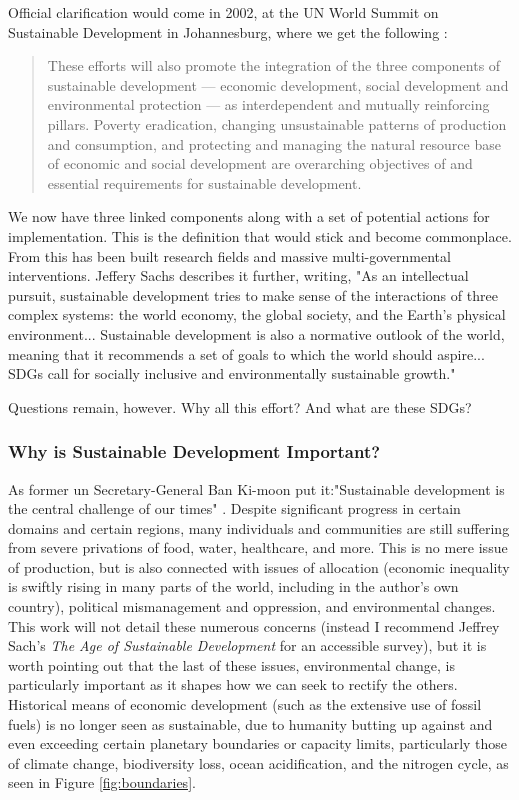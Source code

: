 Official clarification would come in 2002, at the UN World Summit on Sustainable Development in Johannesburg, where we get the following \cite{worldsummitonsustainabledevelopmentPlanImplementationWorld2002}:

\blockquote{These efforts will also promote the integration of the three components of sustainable development — economic development, social development and environmental protection — as interdependent and mutually reinforcing pillars. Poverty eradication, changing unsustainable patterns of production and
consumption, and protecting and managing the natural resource base of economic and social development are overarching objectives of and essential requirements for sustainable development.}

We now have three linked components along with a set of potential actions for implementation. This is the definition that would stick and become commonplace. From this has been built research fields and massive multi-governmental interventions. Jeffery Sachs describes it further, writing, "As an intellectual pursuit, sustainable development tries to make sense of the interactions of three complex systems: the world economy, the global society, and the Earth's physical environment... Sustainable development is also a normative outlook of the world, meaning that it recommends a set of goals to which the world should aspire... SDGs call for socially inclusive and environmentally sustainable growth." \cite{sachsAgeSustainableDevelopment2015}

Questions remain, however. Why all this effort? And what are these SDGs?

\subsubsection{Why is Sustainable Development Important?}

As former \ac{un} Secretary-General Ban Ki-moon put it:"Sustainable development is the central challenge of our times" \cite{sachsAgeSustainableDevelopment2015}. Despite significant progress in certain domains and certain regions, many individuals and communities are still suffering from severe privations of food, water, healthcare, and more. This is no mere issue of production, but is also connected with issues of allocation (economic inequality is swiftly rising in many parts of the world, including in the author's own country), political mismanagement and oppression, and environmental changes. This work will not detail these numerous concerns (instead I recommend Jeffrey Sach's \textit{The Age of Sustainable Development} for an accessible survey), but it is worth pointing out that the last of these issues, environmental change, is particularly important as it shapes how we can seek to rectify the others. Historical means of economic development (such as the extensive use of fossil fuels) is no longer seen as sustainable, due to humanity butting up against and even exceeding certain planetary boundaries or capacity limits, particularly those of climate change, biodiversity loss, ocean acidification, and the nitrogen cycle, as seen in Figure \ref{fig:boundaries}.


